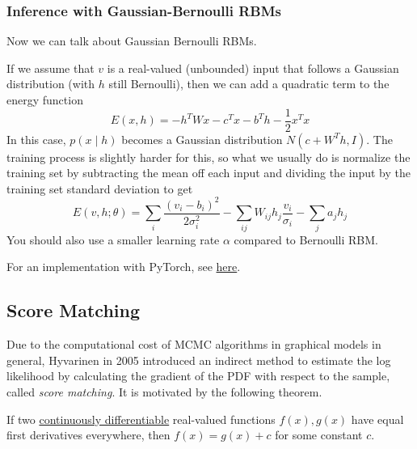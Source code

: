 \documentclass{article}
\begin{document}
  \subsubsection{Inference with Gaussian-Bernoulli RBMs}

    Now we can talk about Gaussian Bernoulli RBMs. 

    \begin{definition}
      \label{def:gaussian-bernoulli-rbm}
 
      If we assume that $v$ is a real-valued (unbounded) input that follows a Gaussian distribution (with $h$ still Bernoulli), then we can add a quadratic term to the energy function 
      \begin{equation} 
        E(x, h) = - h^T W x - c^T x - b^T h - \frac{1}{2} x^T x
      \end{equation}
      In this case, $p(x \mid h)$ becomes a Gaussian distribution $N(c + W^T h, I)$. The training process is slightly harder for this, so what we usually do is normalize the training set by subtracting the mean off each input and dividing the input by the training set standard deviation to get  
      \begin{equation} 
        E(v, h; \theta) = \sum_i \frac{(v_i - b_i)^2}{2 \sigma_i^2} - \sum_{ij} W_{ij} h_j \frac{v_i}{\sigma_i} - \sum_j a_j h_j
      \end{equation}
      You should also use a smaller learning rate $\alpha$ compared to Bernoulli RBM. 
    \end{definition} 

    \begin{algo}[Implementation]
      For an implementation with PyTorch, see \href{code/rbm.html}{here}. 
    \end{algo}

\subsection{Score Matching} 

    Due to the computational cost of MCMC algorithms in graphical models in general, Hyvarinen in 2005 introduced an indirect method to estimate the log likelihood by calculating the gradient of the PDF with respect to the sample, called \textit{score matching}. It is motivated by the following theorem. 

    \begin{theorem}
      \label{thm:equal-gradients-imply-equality-up-to-a-constant}
      If two \hyperref[mv-def:continuously-differentiable]{continuously differentiable} real-valued functions $f(x), g(x)$ have equal first derivatives everywhere, then $f(x) = g(x) + c$ for some constant $c$. 
    \end{theorem}
\end{document}
